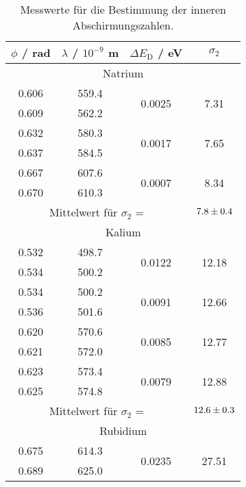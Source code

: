 \begin{table}[H]
  \centering
  \begin{tabular}{c|c|c|c}
    \hline
    $\phi$ / rad & $\lambda$ / $10^{-9}$ m & $\Delta E_\text{D}$ / eV & $\sigma_2$ \\
    \hline
    \multicolumn{4}{c}{Natrium} \\
    \hline
    0.606 & 559.4 & \multirow{2}{*}{0.0025} & \multirow{2}{*}{7.31} \\
    0.609 & 562.2 & & \\
    \hline
    0.632 & 580.3 & \multirow{2}{*}{0.0017} & \multirow{2}{*}{7.65} \\
    0.637 & 584.5 & & \\
    \hline
    0.667 & 607.6 & \multirow{2}{*}{0.0007} & \multirow{2}{*}{8.34} \\
    0.670 & 610.3 & & \\
    \hline
    \multicolumn{3}{c}{Mittelwert für $\sigma_2$ =} & $\num{7.8 +- 0.4}$ \\
    \hline
    \multicolumn{4}{c}{Kalium} \\
    \hline
    0.532 & 498.7 & \multirow{2}{*}{0.0122} & \multirow{2}{*}{12.18} \\
    0.534 & 500.2 & & \\
    \hline
    0.534 & 500.2 & \multirow{2}{*}{0.0091} & \multirow{2}{*}{12.66} \\
    0.536 & 501.6 & & \\
    \hline
    0.620 & 570.6 & \multirow{2}{*}{0.0085} & \multirow{2}{*}{12.77} \\
    0.621 & 572.0 & & \\
    \hline
    0.623 & 573.4 & \multirow{2}{*}{0.0079} & \multirow{2}{*}{12.88} \\
    0.625 & 574.8 & & \\
    \hline
    \multicolumn{3}{c}{Mittelwert für $\sigma_2$ =} & $\num{12.6 +- 0.3}$ \\
    \hline
    \multicolumn{4}{c}{Rubidium} \\
    \hline
    0.675 & 614.3 & \multirow{2}{*}{0.0235} & \multirow{2}{*}{27.51} \\
    0.689 & 625.0 & & \\
    \hline
  \end{tabular}
  \caption{Messwerte für die Bestimmung der inneren Abschirmungszahlen.}
  \label{tab:Mess3}
\end{table}
